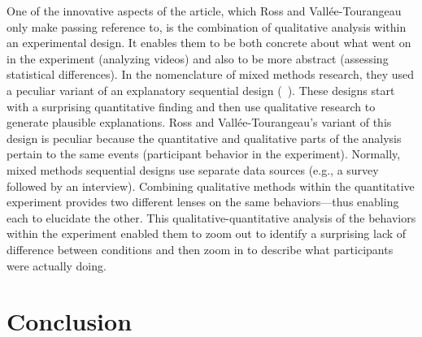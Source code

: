 \documentclass[twocolumn, serif, reflection, authordate]{jote-article}
\begin{document}
One of the innovative aspects of the article, which Ross and
Vallée-Tourangeau only make passing reference to, is the combination of
qualitative analysis within an experimental design. It enables them to
be both concrete about what went on in the experiment (analyzing videos)
and also to be more abstract (assessing statistical differences). In the
nomenclature of mixed methods research, they used a peculiar variant of
an explanatory sequential design (~\citeyear{Creswell2018}). These
designs start with a surprising quantitative finding and then use
qualitative research to generate plausible explanations. Ross and
Vallée-Tourangeau's variant of this design is peculiar because the
quantitative and qualitative parts of the analysis pertain to the same
events (participant behavior in the experiment). Normally, mixed methods
sequential designs use separate data sources (e.g., a survey followed by
an interview). Combining qualitative methods within the quantitative
experiment provides two different lenses on the same behaviors—thus
enabling each to elucidate the other. This qualitative-quantitative
analysis of the behaviors within the experiment enabled them to zoom out
to identify a surprising lack of difference between conditions and then
zoom in to describe what participants were actually doing.

\section*{Conclusion}
\end{document}

